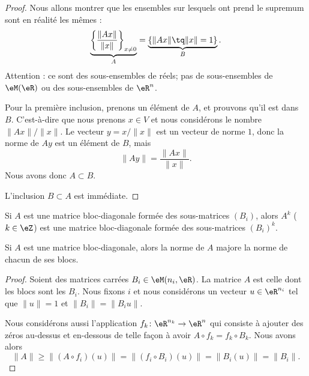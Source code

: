 \begin{proof}
	Nous allons montrer que les ensembles sur lesquels ont prend le supremum sont en réalité les mêmes :
	\begin{equation}
		\underbrace{\left\{ \frac{ \| Ax \| }{ \| x \| }\right\}_{x\neq 0}}_{A}=\underbrace{\left\{ \| Ax \|\tq \| x \|=1 \right\}}_{B}.
	\end{equation}
	Attention : ce sont des sous-ensembles de réels; pas de sous-ensembles de \( \eM(\eR)\) ou des sous-ensembles de \( \eR^n\).

	Pour la première inclusion, prenons un élément de \( A\), et prouvons qu'il est dans \( B\). C'est-à-dire que nous prenons \( x\in V\) et nous considérons le nombre \( \| Ax \|/\| x \|\). Le vecteur \( y=x/\| x \|\) est un vecteur de norme \( 1\), donc la norme de \( Ay\) est un élément de \( B\), mais
	\begin{equation}
		\| Ay \|=\frac{ \| Ax \| }{ \| x \| }.
	\end{equation}
	Nous avons donc \( A\subset B\).

	L'inclusion \( B\subset A\) est immédiate.
\end{proof}

\begin{lemma}       \label{LEMooHGCKooBzfAtg}
	Si \( A\) est une matrice bloc-diagonale formée des sous-matrices \( (B_i)\), alors \( A^k\) (\( k\in \eZ\)) est une matrice bloc-diagonale formée des sous-matrices \( (B_i)^k\).
\end{lemma}

\begin{proposition}      \label{PROPooJUYCooHnlFef}
	Si \( A\) est une matrice bloc-diagonale, alors la norme de \( A\) majore la norme de chacun de ses blocs.
\end{proposition}

\begin{proof}
	Soient des matrices carrées \( B_i\in \eM(n_i,\eR)\). La matrice \( A\) est celle dont les blocs sont les \( B_i\). Nous fixons \( i\) et nous considérons un vecteur \( u\in \eR^{n_i}\) tel que \( \| u \|=1\) et \( \| B_i \|=\| B_iu \|\).

	Nous considérons aussi l'application \(f_k \colon \eR^{n_k}\to \eR^n  \) qui consiste à ajouter des zéros au-dessus et en-dessous de telle façon à avoir \( A\circ f_k=f_k\circ B_k\). Nous avons alors
	\begin{equation}
		\| A \|\geq \| (A\circ f_i)(u) \|=\| (f_i\circ B_i)(u) \|=\| B_i(u) \|=\| B_i \|.
	\end{equation}
\end{proof}


